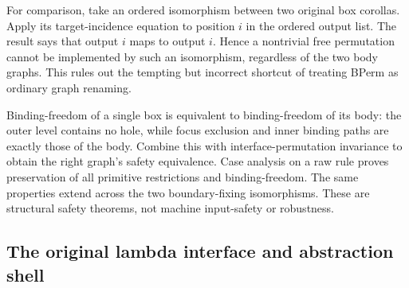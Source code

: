 


For comparison, take an ordered isomorphism between two original box
corollas. Apply its target-incidence equation to position $i$ in the ordered
output list. The result says that output $i$ maps to output $i$. Hence a
nontrivial free permutation cannot be implemented by such an isomorphism,
regardless of the two body graphs. This rules out the tempting but incorrect
shortcut of treating BPerm as ordinary graph renaming.



Binding-freedom of a single box is equivalent to binding-freedom of its
body: the outer level contains no hole, while focus exclusion and inner binding
paths are exactly those of the body. Combine this with interface-permutation
invariance to obtain the right graph's safety equivalence. Case analysis on a
raw rule proves preservation of all primitive restrictions and binding-freedom.
The same properties extend across the two boundary-fixing isomorphisms.
These are structural safety theorems, not machine input-safety or robustness.







\subsection{The original lambda interface and abstraction shell}

